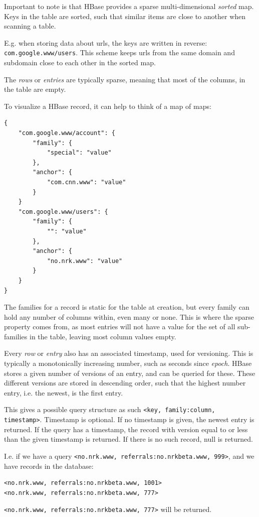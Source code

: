 Important to note is that HBase provides a sparse multi-dimensional \emph{sorted} map.
Keys in the table are sorted, such that similar items are close to another when scanning a table.

E.g. when storing data about urls, the keys are written in reverse: \texttt{com.google.www/users}. This scheme keeps urls from the same domain and subdomain close to each other in the sorted map.

The \emph{rows} or \emph{entries} are typically sparse, meaning that most of the columns, in the table are empty.

To visualize a HBase record, it can help to think of a map of maps:

\begin{lstlisting}
{
	"com.google.www/account": {
		"family": {
			"special": "value"
		},
		"anchor": {
			"com.cnn.www": "value"
		}
	}
	"com.google.www/users": {
		"family": {
			"": "value"
		},
		"anchor": {
			"no.nrk.www": "value"
		}
	}
}
\end{lstlisting}

The families for a record is static for the table at creation, but every family can hold any number of columns within, even many or none.
This is where the sparse property comes from, as most entries will not have a value for the set of all sub-families in the table, leaving most column values empty.

Every \emph{row} or \emph{entry} also has an associated timestamp, used for versioning. This is typically a monotonically increasing number, such as seconds since \emph{epoch}. HBase stores a given number of versions of an entry, and can be queried for these. 
These different versions are stored in descending order, such that the highest number entry, i.e. the newest, is the first entry.

This gives a possible query structure as such \texttt{<key, family:column, timestamp>}. Timestamp is optional. If no timestamp is given, the newest entry is returned. 
If the query has a timestamp, the record with version equal to or less than the given timestamp is returned. If there is no such record, null is returned.

I.e. if we have a query \texttt{<no.nrk.www, referrals:no.nrkbeta.www, 999>}, and we have records in the database:
\begin{lstlisting}
<no.nrk.www, referrals:no.nrkbeta.www, 1001>
<no.nrk.www, referrals:no.nrkbeta.www, 777>
\end{lstlisting}
\texttt{<no.nrk.www, referrals:no.nrkbeta.www, 777>} will be returned.

